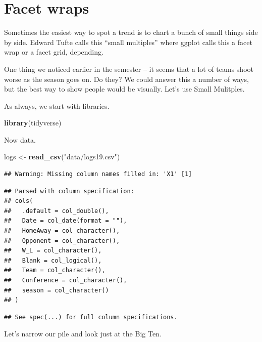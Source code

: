 \documentclass[]{book}
\newenvironment{Shaded}{\begin{snugshade}}{\end{snugshade}}
\newcommand{\KeywordTok}[1]{\textcolor[rgb]{0.13,0.29,0.53}{\textbf{#1}}}
\newcommand{\StringTok}[1]{\textcolor[rgb]{0.31,0.60,0.02}{#1}}
\newcommand{\OperatorTok}[1]{\textcolor[rgb]{0.81,0.36,0.00}{\textbf{#1}}}
\newcommand{\NormalTok}[1]{#1}
\begin{document}
\chapter{Facet wraps}\label{facet-wraps}

Sometimes the easiest way to spot a trend is to chart a bunch of small
things side by side. Edward Tufte calls this ``small multiples'' where
ggplot calls this a facet wrap or a facet grid, depending.

One thing we noticed earlier in the semester -- it seems that a lot of
teams shoot worse as the season goes on. Do they? We could answer this a
number of ways, but the best way to show people would be visually. Let's
use Small Mulitples.

As always, we start with libraries.

\begin{Shaded}
\begin{Highlighting}[]
\KeywordTok{library}\NormalTok{(tidyverse)}
\end{Highlighting}
\end{Shaded}

Now data.

\begin{Shaded}
\begin{Highlighting}[]
\NormalTok{logs <-}\StringTok{ }\KeywordTok{read_csv}\NormalTok{(}\StringTok{"data/logs19.csv"}\NormalTok{)}
\end{Highlighting}
\end{Shaded}

\begin{verbatim}
## Warning: Missing column names filled in: 'X1' [1]
\end{verbatim}

\begin{verbatim}
## Parsed with column specification:
## cols(
##   .default = col_double(),
##   Date = col_date(format = ""),
##   HomeAway = col_character(),
##   Opponent = col_character(),
##   W_L = col_character(),
##   Blank = col_logical(),
##   Team = col_character(),
##   Conference = col_character(),
##   season = col_character()
## )
\end{verbatim}

\begin{verbatim}
## See spec(...) for full column specifications.
\end{verbatim}

Let's narrow our pile and look just at the Big Ten.

\begin{Shaded}
\end{Shaded}
\end{document}
